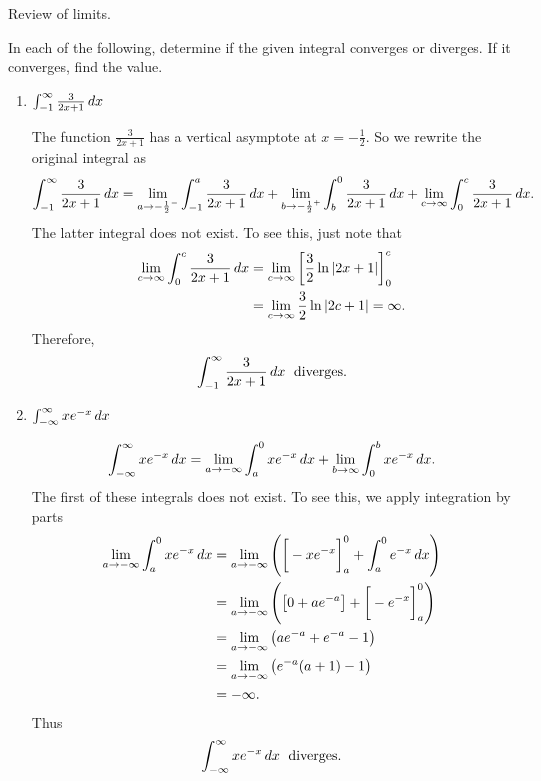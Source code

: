 \documentclass[handout,instructornotes]{ximera}
\begin{document}
\begin{instructorNotes}
Review of limits.
\end{instructorNotes}








\begin{problem}
In each of the following, determine if the given integral converges or diverges.  
If it converges, find the value.

	\begin{enumerate}
	
	\item  $\int_{-1}^{\infty} \frac{3}{2x+1} \,d x$
	\begin{freeResponse}
	The function $\frac{3}{2x+1}$ has a vertical asymptote at $x=- \frac{1}{2}$.  
	So we rewrite the original integral as
		\[
		\int_{-1}^{\infty} \frac{3}{2x+1} \,d x = \lim_{a \to -\frac{1}{2}^-} \int_{-1}^a \frac{3}{2x+1} \,d x  
		+ \lim_{b \to -\frac{1}{2}^+} \int_b^0 \frac{3}{2x+1} \,d x + \lim_{c \to \infty} \int_0^c \frac{3}{2x+1} \,d x.
		\]
	The latter integral does not exist.  
	To see this, just note that
		\begin{align*}
		 \lim_{c \to \infty} \int_0^c \frac{3}{2x+1} \,d x 
		 &= \lim_{c \to \infty} \bigg[ \frac{3}{2} \ln|2x+1| \bigg]_0^c  \\
		 &= \lim_{c \to \infty} \frac{3}{2} \ln|2c+1| = \infty.
		\end{align*}
	Therefore, 
		\[
		\int_{-1}^{\infty} \frac{3}{2x+1} \,d x \; \text{ diverges.}
		\]
	\end{freeResponse}
	
	
	
	\item  $\int_{-\infty}^{\infty} x e^{-x} \,d x$
	\begin{freeResponse}
	\[
	\int_{-\infty}^{\infty} x e^{-x} \,d x = \lim_{a \to -\infty} \int_a^0 xe^{-x} \,d x + \lim_{b \to \infty} \int_0^b xe^{-x} \,d x.
	\]
	The first of these integrals does not exist.  
	To see this, we apply integration by parts
		\begin{align*}
		\lim_{a \to -\infty} \int_a^0 xe^{-x} \,d x
		&= \lim_{a \to -\infty} \left( \bigg[ -xe^{-x} \bigg]_a^0 + \int_a^0 e^{-x} \,d x \right)  \\
		&= \lim_{a \to -\infty} \left( \left[ 0 + ae^{-a} \right] + \bigg[ -e^{-x} \bigg]_a^0 \right)  \\
		&= \lim_{a \to -\infty} \left( ae^{-a} + e^{-a} - 1 \right)  \\
		&= \lim_{a \to -\infty} \left( e^{-a}(a+1) - 1 \right)  \\
		&= - \infty.
		\end{align*}
	Thus
		\[
		\int_{-\infty}^{\infty} x e^{-x} \,d x \; \text{ diverges.}
		\]
	\end{freeResponse}
	

\end{enumerate}
\end{problem}
\end{document}
